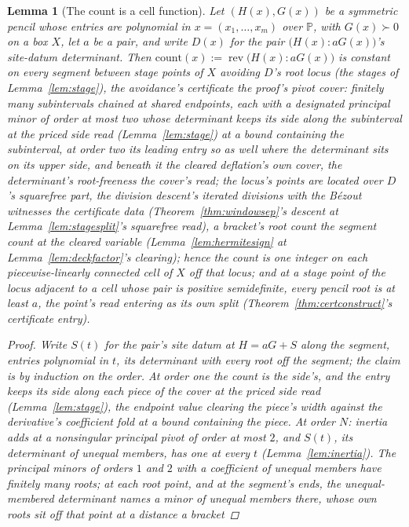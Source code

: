 \documentclass[11pt]{article}
\newtheorem{lemma}{Lemma}
\theoremstyle{definition}
\begin{document}
\begin{lemma}[The count is a cell function]\label{lem:cellcount}
Let $(H(x),G(x))$ be a symmetric pencil whose entries are polynomial in
$x=(x_1,\dots,x_m)$ over $\mathbb P$, with $G(x)\succ0$ on a box $X$, let
$a$ be a pair, and write $D(x)$ for the pair
$\big(H(x)\!:\!aG(x)\big)$'s site-datum determinant. Then
$\mathrm{count}(x):=\operatorname{rev}\big(H(x)\!:\!aG(x)\big)$ is
constant on every segment between stage points of $X$ avoiding
$D$'s root locus (the stages of Lemma~\ref{lem:stage}), the
avoidance's certificate the proof's pivot cover: finitely many
subintervals chained at shared endpoints, each with a designated
principal minor of order at most two whose determinant keeps its
side along the subinterval at the priced side read
(Lemma~\ref{lem:stage}) at a bound containing the subinterval, at
order two its leading entry so as well where the determinant sits
on its upper side, and
beneath it the cleared deflation's own cover, the determinant's
root-freeness the cover's read; the locus's points are located
over $D$'s squarefree part, the division descent's iterated
divisions with the B\'ezout witnesses the certificate data
(Theorem~\ref{thm:windowsep}'s descent at
Lemma~\ref{lem:stagesplit}'s squarefree read), a bracket's root
count the segment count at the cleared variable
(Lemma~\ref{lem:hermitesign} at Lemma~\ref{lem:deckfactor}'s
clearing); hence the count is one integer on each
piecewise-linearly connected cell of $X$ off that locus; and at a
stage point of the locus adjacent to a cell whose pair is positive
semidefinite, every pencil
root is at least $a$, the point's read entering as its own split
(Theorem~\ref{thm:certconstruct}'s certificate entry).
\begin{proof}
Write $S(t)$ for the pair's site datum at $H=aG+S$ along the
segment, entries polynomial in $t$, its
determinant with every root off the segment; the claim is by induction
on the order. At order one the count is the side's, and the entry
keeps its side along each piece of the cover at the priced side
read (Lemma~\ref{lem:stage}), the endpoint value clearing the
piece's width against the derivative's coefficient fold at a bound
containing the piece. At order
$N$: inertia adds at a nonsingular principal pivot of order at most $2$,
and $S(t)$, its determinant of unequal members, has one at every $t$
(Lemma~\ref{lem:inertia}). The principal minors of orders $1$ and $2$
with a coefficient of unequal members have finitely many roots; at
each root point, and at the segment's ends, the unequal-membered
determinant names a minor of unequal members there, whose own roots sit off that point at a distance a bracket

\end{proof}
\end{lemma}
\end{document}
